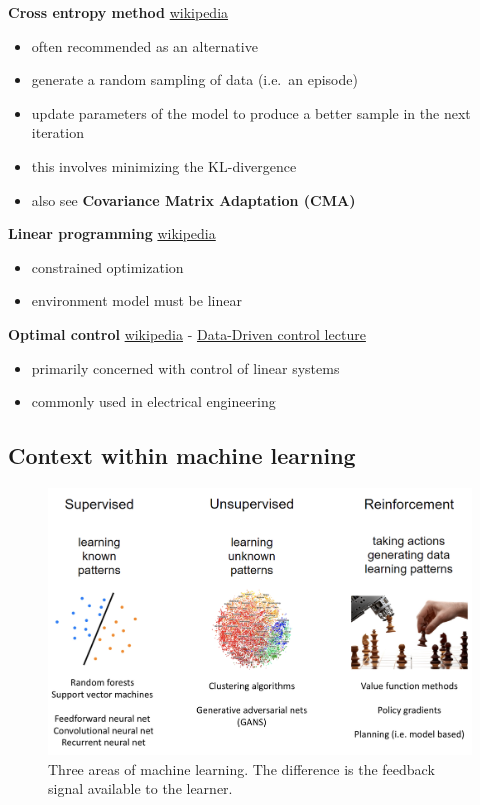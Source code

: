\documentclass[]{article}
\providecommand{\tightlist}{%
  \setlength{\itemsep}{0pt}\setlength{\parskip}{0pt}}
\begin{document}
\textbf{Cross entropy method}
\href{https://en.wikipedia.org/wiki/Cross-entropy_method}{wikipedia}

\begin{itemize}
\tightlist
\item
  often recommended as an alternative
\item
  generate a random sampling of data (i.e.~an episode)
\item
  update parameters of the model to produce a better sample in the next
  iteration
\item
  this involves minimizing the KL-divergence
\item
  also see \textbf{Covariance Matrix Adaptation (CMA)}
\end{itemize}

\textbf{Linear programming}
\href{https://en.wikipedia.org/wiki/Linear_programming}{wikipedia}

\begin{itemize}
\tightlist
\item
  constrained optimization
\item
  environment model must be linear
\end{itemize}

\textbf{Optimal control}
\href{https://en.wikipedia.org/wiki/Optimal_control}{wikipedia} -
\href{https://www.youtube.com/watch?v=oulLR06lj_E}{Data-Driven control
lecture}

\begin{itemize}
\tightlist
\item
  primarily concerned with control of linear systems
\item
  commonly used in electrical engineering
\end{itemize}

\newpage

\hypertarget{context-within-machine-learning}{%
\subsection{Context within machine
learning}\label{context-within-machine-learning}}

\begin{figure}
\centering
\includegraphics[width=\textwidth,height=0.3\textheight]{./tex2pdf.-4c1708fb449e9e84/6e3b6e89fcfbd67b1f2060ede8d3c3a9f88c321d.png}
\caption{Three areas of machine learning. The difference is the feedback
signal available to the learner.}
\end{figure}
\end{document}
